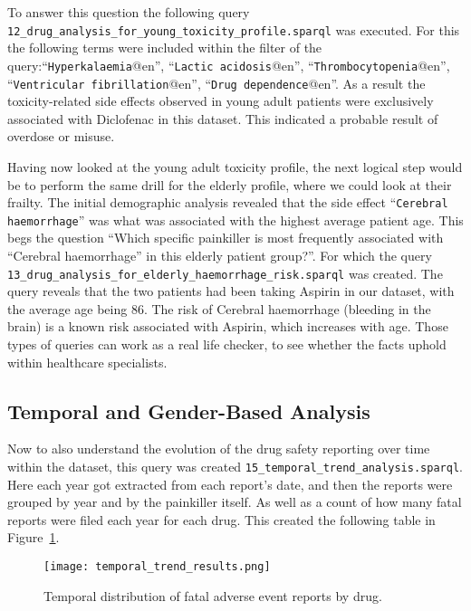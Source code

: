 \begin{sloppypar}
To answer this question the following query \nolinkurl{12_drug_analysis_for_young_toxicity_profile.sparql} was executed. For this the following terms were included within the filter of the query:``\texttt{Hyper\-kalaemia}@en'', ``\texttt{Lactic acidosis}@en'', ``\texttt{Thrombo\-cyto\-penia}@en'', ``\texttt{Ventricular fib\-ril\-lation}@en'', ``\texttt{Drug dependence}@en''.  As a result the toxicity-related side effects observed in young adult patients were exclusively associated with Diclofenac in this dataset. This indicated a probable result of overdose or misuse.
\end{sloppypar}

Having now looked at the young adult toxicity profile, the next logical step would be to perform the same drill for the elderly profile, where we could look at their frailty. The initial demographic analysis revealed that the side effect ``\texttt{Cerebral haemorrhage}'' was what was associated with the highest average patient age. This begs the question “Which specific painkiller is most frequently associated with “Cerebral haemorrhage” in this elderly patient group?”. For which the query \nolinkurl{13_drug_analysis_for_elderly_haemorrhage_risk.sparql} was created. The query reveals that the two patients had been taking Aspirin in our dataset, with the average age being 86. The risk of Cerebral haemorrhage (bleeding in the brain) is a known risk associated with Aspirin, which increases with age. Those types of queries can work as a real life checker, to see whether the facts uphold within healthcare specialists.

\subsection{Temporal and Gender-Based Analysis}
Now to also understand the evolution of the drug safety reporting over time within the dataset, this query was created \nolinkurl{15_temporal_trend_analysis.sparql}.  Here each year got extracted from each report's date, and then the reports were grouped by year and by the painkiller itself. As well as a count of how many fatal reports were filed each year for each drug. This created the following table in Figure~\ref{fig:temporal_trend_results}.

\begin{figure}[H]
\centering
\texttt{[image: temporal\_trend\_results.png]} %
\caption{Temporal distribution of fatal adverse event reports by drug.}
\label{fig:temporal_trend_results}
\end{figure}


